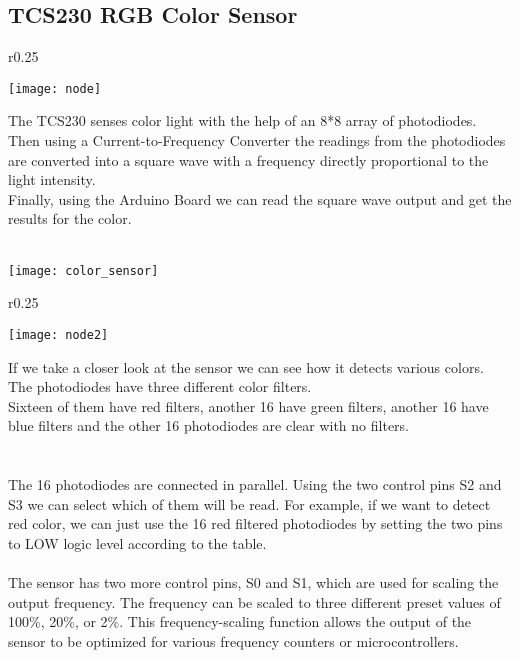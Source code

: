 \subsection{TCS230 RGB Color Sensor}

\begin{wrapfigure}{r}{0.25\textwidth}
    \begin{center}
      \texttt{[image: node]}
    \end{center}
  \end{wrapfigure}

The TCS230 senses color light with the help of an 8*8 array of
photodiodes.\\
Then using a Current-to-Frequency Converter the readings from the
photodiodes are converted into a square wave with a frequency directly
proportional to the light intensity.\\
Finally, using the Arduino Board we can read the square wave output and
get the results for the color.\\\\

\begin{center}
    
\texttt{[image: color\_sensor]}
\end{center}

\begin{wrapfigure}{r}{0.25\textwidth}
    \begin{center}
      \texttt{[image: node2]}
    \end{center}
  \end{wrapfigure}

  If we take a closer look at the sensor we can see how it detects various colors.
  The photodiodes have three different color filters.\\
  Sixteen of them have red filters, another 16 have green filters, another 16 have
  blue filters and the other 16 photodiodes are clear with no filters.\\\\\\

  The 16 photodiodes are connected in parallel. Using the two control pins S2 and S3 we can select
which of them will be read. For example, if we want to detect red color, we can just use the 16 red
filtered photodiodes by setting the two pins to LOW logic level according to the table.\\\\
The sensor has two more control pins, S0 and S1, which are used for scaling the output frequency.
The frequency can be scaled to three different preset values of 100\%, 20\%, or 2\%.
This frequency-scaling function allows the output of the sensor to be optimized for various frequency
counters or microcontrollers.

